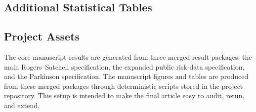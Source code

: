 \subsection{Additional Statistical Tables}





\subsection{Project Assets}

The core manuscript results are generated from three merged result packages: the main Rogers--Satchell specification, the expanded public risk-data specification, and the Parkinson specification. The manuscript figures and tables are produced from these merged packages through deterministic scripts stored in the project repository. This setup is intended to make the final article easy to audit, rerun, and extend.
